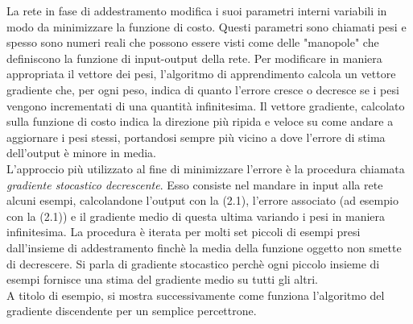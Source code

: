 La rete in fase di addestramento modifica i suoi parametri interni variabili in modo da
 minimizzare la funzione di costo. Questi parametri sono chiamati pesi e spesso sono numeri 
 reali che possono essere visti come delle "manopole" che definiscono la funzione di input-output
  della rete.
Per modificare in maniera appropriata il vettore dei pesi, l’algoritmo di apprendimento calcola 
un vettore gradiente che, per ogni peso, indica di quanto l’errore cresce o decresce se 
i pesi vengono incrementati di una quantità infinitesima. Il vettore gradiente,
 calcolato sulla funzione di costo indica la direzione più ripida e 
 veloce su come andare a aggiornare i pesi stessi, portandosi sempre più vicino a dove
l’errore di stima dell'output è minore in media.\\
L’approccio più utilizzato al fine di minimizzare l’errore è la procedura chiamata \emph{gradiente stocastico 
decrescente}. Esso consiste nel mandare in input alla rete alcuni esempi,
calcolandone l’output con la (2.1), l’errore associato (ad esempio con la (2.1)) e il gradiente medio
di questa ultima variando i pesi in maniera infinitesima. La procedura è
iterata per molti set piccoli di esempi presi dall’insieme di addestramento finchè la media
della funzione oggetto non smette di decrescere. Si parla di gradiente stocastico perchè ogni piccolo
 insieme di esempi fornisce una stima del gradiente medio su tutti gli altri.\\
A titolo di esempio, si mostra successivamente come funziona l’algoritmo del gradiente discendente 
per un semplice percettrone. 
